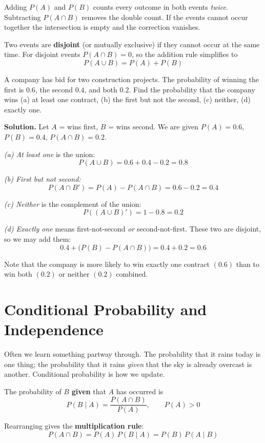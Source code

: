 \documentclass[a4paper,11pt]{article}
\begin{document}
Adding $P(A)$ and $P(B)$ counts every outcome in both events \emph{twice}.
Subtracting $P(A \cap B)$ removes the double count. If the events cannot occur
together the intersection is empty and the correction vanishes.

\begin{keybox}
Two events are \textbf{disjoint} (or mutually exclusive) if they cannot occur at
the same time. For disjoint events $P(A \cap B) = 0$, so the addition rule
simplifies to
\[ P(A \cup B) = P(A) + P(B) \]
\end{keybox}

\begin{example}
A company has bid for two construction projects. The probability of winning the
first is $0.6$, the second $0.4$, and both $0.2$. Find the probability that the
company wins (a) at least one contract, (b) the first but not the second,
(c) neither, (d) exactly one.

\medskip
\textbf{Solution.} Let $A$ = wins first, $B$ = wins second. We are given
$P(A) = 0.6$, $P(B) = 0.4$, $P(A \cap B) = 0.2$.

\emph{(a) At least one} is the union:
\[ P(A \cup B) = 0.6 + 0.4 - 0.2 = 0.8 \]

\emph{(b) First but not second:}
\[ P(A \cap B') = P(A) - P(A \cap B) = 0.6 - 0.2 = 0.4 \]

\emph{(c) Neither} is the complement of the union:
\[ P((A \cup B)') = 1 - 0.8 = 0.2 \]

\emph{(d) Exactly one} means first-not-second \emph{or} second-not-first. These
two are disjoint, so we may add them:
\[ 0.4 + \big(P(B) - P(A \cap B)\big) = 0.4 + 0.2 = 0.6 \]

Note that the company is more likely to win exactly one contract $(0.6)$ than to
win both $(0.2)$ or neither $(0.2)$ combined.
\end{example}

\section{Conditional Probability and Independence}

Often we learn something partway through. The probability that it rains today is
one thing; the probability that it rains \emph{given} that the sky is already
overcast is another. Conditional probability is how we update.

\begin{keybox}
The probability of $B$ \textbf{given} that $A$ has occurred is
\[ P(B \mid A) = \frac{P(A \cap B)}{P(A)}, \qquad P(A) > 0 \]

Rearranging gives the \textbf{multiplication rule}:
\[ P(A \cap B) = P(A)\,P(B \mid A) = P(B)\,P(A \mid B) \]
\end{keybox}
\end{document}
